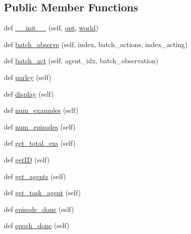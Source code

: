 \subsection*{Public Member Functions}
\begin{DoxyCompactItemize}
\item 
def \hyperlink{classparlai_1_1core_1_1worlds_1_1BatchWorld_ac479dd6a5843a2fcf30d8acc1accc6a6}{\+\_\+\+\_\+init\+\_\+\+\_\+} (self, \hyperlink{classparlai_1_1core_1_1worlds_1_1BatchWorld_a75c0ed09cce56774c61c9f59b543ed88}{opt}, \hyperlink{classparlai_1_1core_1_1worlds_1_1BatchWorld_ad7d651ac0fb1ee9b52ba7f134602e98e}{world})
\item 
def \hyperlink{classparlai_1_1core_1_1worlds_1_1BatchWorld_a01faab842dc28b580dcaeacee491c5f5}{batch\+\_\+observe} (self, index, batch\+\_\+actions, index\+\_\+acting)
\item 
def \hyperlink{classparlai_1_1core_1_1worlds_1_1BatchWorld_a0bf69fe51e7eb0f8ba2fc3748c8c9181}{batch\+\_\+act} (self, agent\+\_\+idx, batch\+\_\+observation)
\item 
def \hyperlink{classparlai_1_1core_1_1worlds_1_1BatchWorld_a297ab42faba47581774cd9333c874905}{parley} (self)
\item 
def \hyperlink{classparlai_1_1core_1_1worlds_1_1BatchWorld_a2b8dd323969084eedc03a7ab44647117}{display} (self)
\item 
def \hyperlink{classparlai_1_1core_1_1worlds_1_1BatchWorld_a047736ed3867bf7631af02f8eb0528d8}{num\+\_\+examples} (self)
\item 
def \hyperlink{classparlai_1_1core_1_1worlds_1_1BatchWorld_ae3f96cd2de72eb0f333cb29bbf74177b}{num\+\_\+episodes} (self)
\item 
def \hyperlink{classparlai_1_1core_1_1worlds_1_1BatchWorld_ae9aec5868c6870316b6f1983a1e5e0ae}{get\+\_\+total\+\_\+exs} (self)
\item 
def \hyperlink{classparlai_1_1core_1_1worlds_1_1BatchWorld_a995d9405ae22301e3ca46c43521b301a}{get\+ID} (self)
\item 
def \hyperlink{classparlai_1_1core_1_1worlds_1_1BatchWorld_a1fc7faff8ccc60606ccff891d36e6b86}{get\+\_\+agents} (self)
\item 
def \hyperlink{classparlai_1_1core_1_1worlds_1_1BatchWorld_ab57e642368837b1a9ae79231ee213d46}{get\+\_\+task\+\_\+agent} (self)
\item 
def \hyperlink{classparlai_1_1core_1_1worlds_1_1BatchWorld_aa3ef1275372635073ba5cba7df0d1f5d}{episode\+\_\+done} (self)
\item 
def \hyperlink{classparlai_1_1core_1_1worlds_1_1BatchWorld_a006891b1446ef6e593edda1c91cab809}{epoch\+\_\+done} (self)

\end{DoxyCompactItemize}

